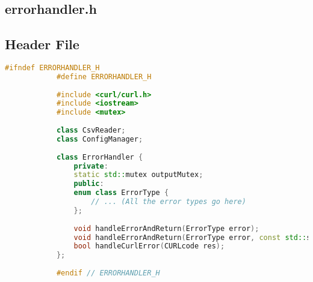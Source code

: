 \documentclass{article}
\begin{document}
	\subsection{errorhandler.h}
	
	\subsection*{Header File}
	\begin{mdframed}[backgroundcolor=background, hidealllines=false, innerleftmargin=15pt, innerrightmargin=5pt, innertopmargin=0pt, innerbottommargin=-5pt]
		\begin{lstlisting}[language=C++]
			#ifndef ERRORHANDLER_H
			#define ERRORHANDLER_H
			
			#include <curl/curl.h>
			#include <iostream>
			#include <mutex>
			
			class CsvReader;
			class ConfigManager;
			
			class ErrorHandler {
				private:
				static std::mutex outputMutex;
				public:
				enum class ErrorType {
					// ... (All the error types go here)
				};
				
				void handleErrorAndReturn(ErrorType error);
				void handleErrorAndReturn(ErrorType error, const std::string& extraInfo);
				bool handleCurlError(CURLcode res);
			};
			
			#endif // ERRORHANDLER_H
		\end{lstlisting}
	\end{mdframed}
	
\end{document}
